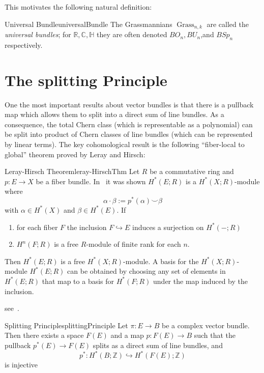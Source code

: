 \documentclass{book}
\newcommand{\C}{{\mathbb{C}}}
\newcommand{\R}{{\mathbb{R}}}
\newcommand{\Z}{{\mathbb{Z}}}
\renewcommand{\H}{{\mathbb{H}}}
\newcommand{\Grass}{{\operatorname{Grass}}}
\begin{document}
\begin{Proof}
  \cite[section~1.2]{NateKTheory}
\end{Proof}

This motivates the following natural definition:

\begin{defn}{Universal Bundle}{universalBundle}
  The Grassmannians $\Grass_{n, k}$ are called the \emph{universal bundles}; for $\R, \C, \H$ they are often
	denoted $BO_n, BU_n$,and $BSp_n$ respectively.
\end{defn}

\section{The splitting Principle}

One the most important results about vector bundles is that there is a pullback map which allows them to split
into a direct sum of line bundles. As a consequence, the total Chern class (which is representable as
a polynomial) can be split into product of Chern classes of line bundles (which can be represented by linear
terms). The key cohomological result is the following ``fiber-local to global'' theorem proved by Leray and
Hirsch:

\begin{thm}{Leray-Hirsch Theorem}{leray-HirschThm}
	Let $R$ be a commutative ring and $p: E \to X$ be a fiber bundle. In~\cite{NateAlgTop} it was shown $H^*(E;R)$
	is a $H^*(X;R)$-module where
	\[
		\alpha\cdot \beta := p^*(\alpha)\smile \beta
	\]
	with $\alpha \in H^*(X)$ and $\beta \in H^*(E)$. If
	\begin{enumerate}
		\item for each fiber $F$ the inclusion $F \hookrightarrow E$ induces a surjection on $H^*(-;R)$
		\item $H^n(F;R)$ is a free $R$-module of finite rank for each $n$.
	\end{enumerate}
	Then $H^*(E;R)$ is a free $H^*(X;R)$-module. A basis for the $H^*(X;R)$-module $H^*(E;R)$ can be obtained
	by choosing any set of elements in $H^*(E;R)$ that map to a basis for $H^*(F;R)$ under the map induced by
	the inclusion.
\end{thm}

\begin{Proof}
	see~\cite{NateAlgTop}.
\end{Proof}


\begin{thm}{Splitting Principle}{splittingPrinciple}
	Let $\pi: E \to B$ be a complex vector bundle. Then there exists a space $F(E)$ and a map $p: F(E) \to B$ such
	that the pullback $p^*(E) \to F(E)$ splits as a direct sum of line bundles, and
	\[
		p^*: H^*(B; \Z) \hookrightarrow H^*(F(E); \Z)
	\]
	is injective
\end{thm}
\end{document}

